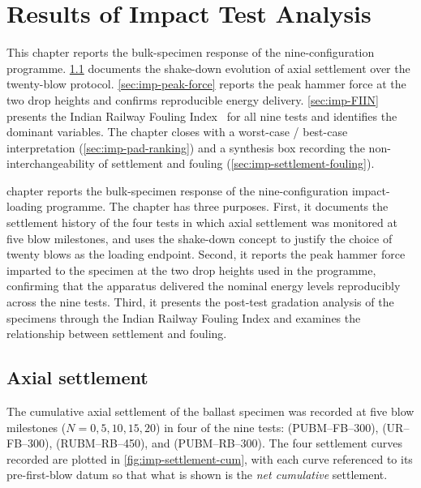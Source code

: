 \chapter[Impact Test Results]{Results of Impact Test Analysis}
\label{chap:impact-results}


\begin{chapterpreview}
This chapter reports the bulk-specimen response of the
nine-configuration programme. \cref{sec:imp-settlement} documents the
shake-down evolution of axial settlement over the twenty-blow protocol.
\cref{sec:imp-peak-force} reports the peak hammer force at the two drop
heights and confirms reproducible energy delivery. \cref{sec:imp-FIIN}
presents the Indian Railway Fouling Index \FIIN\ for all nine tests
and identifies the dominant variables. The chapter closes with a
worst-case / best-case interpretation
(\cref{sec:imp-pad-ranking}) and a synthesis box recording the
non-interchangeability of settlement and fouling
(\cref{sec:imp-settlement-fouling}).
\end{chapterpreview}

 chapter reports the bulk-specimen response of the nine-configuration
impact-loading programme. The chapter has three purposes. First, it
documents the settlement history of the four tests in which axial
settlement was monitored at five blow milestones, and uses the
shake-down concept to justify the choice of twenty blows as the loading
endpoint. Second, it reports the peak hammer force imparted to the
specimen at the two drop heights used in the programme, confirming that the
apparatus delivered the nominal energy levels reproducibly across the nine
tests. Third, it presents the post-test gradation analysis of the specimens
through the Indian Railway Fouling Index \FIIN{} and examines the
relationship between settlement and fouling.

\section{Axial settlement}
\label{sec:imp-settlement}

The cumulative axial settlement of the ballast specimen was recorded at
five blow milestones ($N = 0, 5, 10, 15, 20$) in four of the nine tests:
 (\gls{PUBM}--\gls{FB}--300), 
(\gls{UR}--\gls{FB}--300),  (\gls{RUBM}--\gls{RB}--450), and
 (\gls{PUBM}--\gls{RB}--300). The four settlement curves
recorded are plotted in \cref{fig:imp-settlement-cum}, with each curve
referenced to its pre-first-blow datum so that what is shown is the
\emph{net cumulative} settlement.

